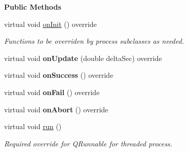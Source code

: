 \begin{Indent}\textbf{ Public Methods}\par
\begin{DoxyCompactItemize}
\item 
\mbox{\label{classrev_1_1_threaded_process_ab09a1fe34fbca5cae0c19536da6fa645}} 
virtual void \mbox{\hyperlink{classrev_1_1_threaded_process_ab09a1fe34fbca5cae0c19536da6fa645}{on\+Init}} () override
\begin{DoxyCompactList}\small\item\em Functions to be overriden by process subclasses as needed. \end{DoxyCompactList}\item 
\mbox{\label{classrev_1_1_threaded_process_a8960d426258d35a803a7ca8be5c94930}} 
virtual void {\bfseries on\+Update} (double delta\+Sec) override
\item 
\mbox{\label{classrev_1_1_threaded_process_ab8a97ac75e82293cca4ec855ca00d608}} 
virtual void {\bfseries on\+Success} () override
\item 
\mbox{\label{classrev_1_1_threaded_process_ae388d550e0246cb8b8997e27d78633b0}} 
virtual void {\bfseries on\+Fail} () override
\item 
\mbox{\label{classrev_1_1_threaded_process_a1b819e6d2cef0ee71d22b82569ed10cf}} 
virtual void {\bfseries on\+Abort} () override
\item 
\mbox{\label{classrev_1_1_threaded_process_a145fdd9d634933c0c0b4a2524b73bd1f}} 
virtual void \mbox{\hyperlink{classrev_1_1_threaded_process_a145fdd9d634933c0c0b4a2524b73bd1f}{run}} ()
\begin{DoxyCompactList}\small\item\em Required override for Q\+Runnable for threaded process. \end{DoxyCompactList}\end{DoxyCompactItemize}
\end{Indent}
